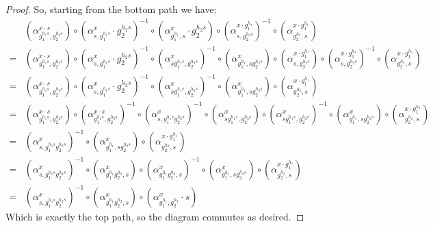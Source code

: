 \documentclass[10pt,a4paper]{amsart}
\begin{document}
\begin{proof}
    So, starting from the bottom path we have:
    \begin{align*}
         &(\alpha_{g_{1}^{h_{1}s},g_{2}^{h_{2}s}}^{x\cdot s}) \circ (\alpha_{s,g_{1}^{h_{1}s}}^{x}\cdot g_{2}^{h_{2}s})^{-1}\circ (\alpha_{g_{1}^{h_{1}},s}^{x} \cdot g_{2}^{h_{2}s})\circ (\alpha_{s,g_{2}^{h_{2}s}}^{x\cdot g_{1}^{h_{1}}})^{-1}\circ(\alpha_{g_{2}^{h_{2}},s}^{x\cdot g_{1}^{h_{1}}}) \\
        =&(\alpha_{g_{1}^{h_{1}s},g_{2}^{h_{2}s}}^{x\cdot s}) \circ (\alpha_{s,g_{1}^{h_{1}s}}^{x}\cdot g_{2}^{h_{2}s})^{-1}\circ (\alpha_{sg_{1}^{h_{1}s},g_{2}^{h_{2}s}}^{x})^{-1}\circ (\alpha_{g_{1}^{h_{1}},sg_{2}^{h_{2}s}}^{x})\circ (\alpha_{s,g_{2}^{h_{2}s}}^{x\cdot g_{1}^{h_{1}}})\circ (\alpha_{s,g_{2}^{h_{2}s}}^{x\cdot g_{1}^{h_{1}}})^{-1}\circ(\alpha_{g_{2}^{h_{2}},s}^{x\cdot g_{1}^{h_{1}}}) \\
        =&(\alpha_{g_{1}^{h_{1}s},g_{2}^{h_{2}s}}^{x\cdot s}) \circ (\alpha_{s,g_{1}^{h_{1}s}}^{x}\cdot g_{2}^{h_{2}s})^{-1}\circ (\alpha_{sg_{1}^{h_{1}s},g_{2}^{h_{2}s}}^{x})^{-1}\circ (\alpha_{g_{1}^{h_{1}},sg_{2}^{h_{2}s}}^{x})\circ(\alpha_{g_{2}^{h_{2}},s}^{x\cdot g_{1}^{h_{1}}}) \\
        =&(\alpha_{g_{1}^{h_{1}s},g_{2}^{h_{2}s}}^{x\cdot s}) \circ (\alpha_{g_{1}^{h_{1}s},g_{2}^{h_{2}s}}^{x\cdot s})^{-1}\circ (\alpha_{s,g_{1}^{h_{1}s}g_{2}^{h_{2}s}}^{x})^{-1}\circ(\alpha_{sg_{1}^{h_{1}s},g_{2}^{h_{2}s}}^{x})\circ (\alpha_{sg_{1}^{h_{1}s},g_{2}^{h_{2}s}}^{x})^{-1}\circ (\alpha_{g_{1}^{h_{1}},sg_{2}^{h_{2}s}}^{x})\circ(\alpha_{g_{2}^{h_{2}},s}^{x\cdot g_{1}^{h_{1}}}) \\
        =&(\alpha_{s,g_{1}^{h_{1}s}g_{2}^{h_{2}s}}^{x})^{-1} \circ (\alpha_{g_{1}^{h_{1}},sg_{2}^{h_{2}s}}^{x}) \circ(\alpha_{g_{2}^{h_{2}},s}^{x\cdot g_{1}^{h_{1}}}) \\
        =&(\alpha_{s,g_{1}^{h_{1}s}g_{2}^{h_{2}s}}^{x})^{-1} \circ (\alpha_{g_{1}^{h_{1}}g_{2}^{h_{2}},s}^{x}) \circ (\alpha_{g_{1}^{h_{1}}g_{2}^{h_{2}},s}^{x})^{-1} \circ (\alpha_{g_{1}^{h_{1}},sg_{2}^{h_{2}s}}^{x})\circ(\alpha_{g_{2}^{h_{2}},s}^{x\cdot g_{1}^{h_{1}}}) \\
        =&(\alpha_{s,g_{1}^{h_{1}s}g_{2}^{h_{2}s}}^{x})^{-1} \circ (\alpha_{g_{1}^{h_{1}}g_{2}^{h_{2}},s}^{x}) \circ (\alpha_{g_{1}^{h_{1}},g_{2}^{h_{2}}}^{x}\cdot s)
    \end{align*}
    Which is exactly the top path, so the diagram commutes as desired.
    \fi


\end{proof}
\end{document}
